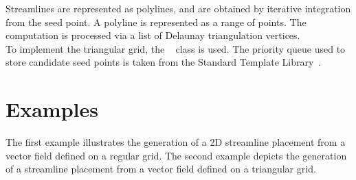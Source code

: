 Streamlines are represented as polylines, and are obtained by
iterative integration from the seed point. A polyline is represented as a range of points. The computation is
processed via a list of Delaunay triangulation vertices.\\

To implement the triangular grid, the \cgal\
 class is used. The priority queue used
to store candidate seed points is taken from the Standard Template
Library~\cite{cgal:sgcsi-stlpg-97}.

\section{Examples}
\label{Section_2D_Streamlines_Example}

The first example illustrates the generation of a 2D streamline
placement from a vector field defined on a regular grid.
The second example depicts the generation of a streamline placement from a vector
field defined on a triangular grid.

